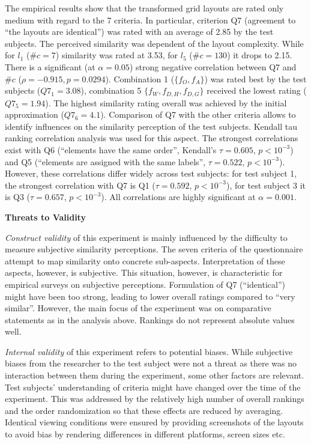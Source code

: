 The empirical results show that the transformed grid layouts are rated only medium with regard to the 7 criteria.
In particular, criterion Q7 (agreement to ``the layouts are identical'') was rated with an average of 2.85 by the test subjects.
The perceived similarity was dependent of the layout complexity.
While for \(l_1\) (\(\#c=7\)) similarity was rated at 3.53, for \(l_5\) (\(\#c=130\)) it drops to 2.15.
There is a significant (at \(\alpha = 0.05\)) strong negative correlation between Q7 and \(\# c\) (\(\rho=-0.915, p=0.0294\)).
Combination 1 (\(\{f_O, f_A\}\)) was rated best by the test subjects (\(Q7_1=3.08\)), combination 5 \(\{f_W, f_{D,H}, f_{D,G}\}\) received the lowest rating (\(Q7_5=1.94\)).
The highest similarity rating overall was achieved by the initial approximation (\(Q7_6=4.1\)).
Comparison of Q7 with the other criteria allows to identify influences on the similarity perception of the test subjects.
Kendall tau ranking correlation analysis was used for this aspect.
The strongest correlations exist with Q6 (``elements have the same order'', Kendall's \(\tau = 0.605\), \(p<10^{-3}\)) and Q5 (``elements are assigned with the same labels'', \(\tau = 0.522\), \(p<10^{-3}\)).
However, these correlations differ widely across test subjects: for test subject 1, the strongest correlation with Q7 is Q1 (\(\tau = 0.592\), \(p<10^{-3}\)), for test subject 3 it is Q3 (\(\tau = 0.657\), \(p<10^{-3}\)).
All correlations are highly significant at \(\alpha = 0.001\).

\textbf{Threats to Validity}

\emph{Construct validity} of this experiment is mainly influenced by the difficulty to measure subjective similarity perceptions.
The seven criteria of the questionnaire attempt to map similarity onto concrete sub-aspects.
Interpretation of these aspects, however, is subjective.
This situation, however, is characteristic for empirical surveys on subjective perceptions.
Formulation of Q7 (``identical'') might have been too strong, leading to lower overall ratings compared to ``very similar''.
However, the main focus of the experiment was on comparative statements as in the analysis above.
Rankings do not represent absolute values well.

\emph{Internal validity} of this experiment refers to potential biases.
While subjective biases from the researcher to the test subject were not a threat as there was no interaction between them during the experiment, some other factors are relevant.
Test subjects' understanding of criteria might have changed over the time of the experiment.
This was addressed by the relatively high number of overall rankings and the order randomization so that these effects are reduced by averaging.
Identical viewing conditions were ensured by providing screenshots of the layouts to avoid bias by rendering differences in different platforms, screen sizes etc.

